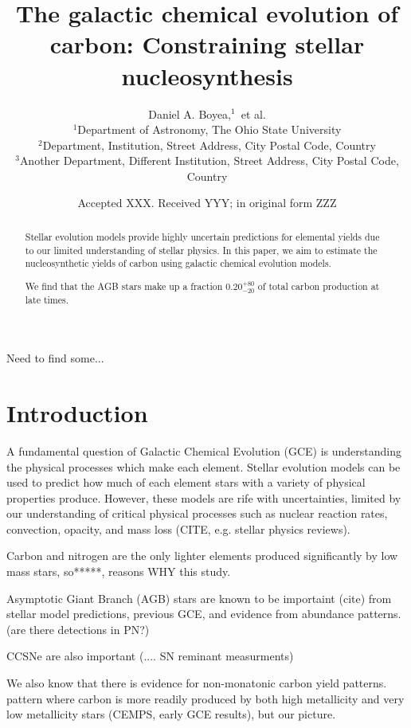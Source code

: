 \documentclass[fleqn,usenatbib]{mnras}
\title[Constraining carbon yields]{The galactic chemical evolution of carbon: Constraining stellar nucleosynthesis}
\author[D. A. Boyea et al.]{
Daniel A. Boyea,$^{1}$\
et al.
\\
$^{1}$Department of Astronomy, The Ohio State University\\
$^{2}$Department, Institution, Street Address, City Postal Code, Country\\
$^{3}$Another Department, Different Institution, Street Address, City Postal Code, Country
}
\date{Accepted XXX. Received YYY; in original form ZZZ}
\begin{document}
\label{firstpage}
\pagerange{\pageref{firstpage}--\pageref{lastpage}}
\maketitle

\begin{abstract}
Stellar evolution models provide highly uncertain predictions for elemental yields due to our limited understanding of stellar physics. In this paper, we aim to estimate the nucleosynthetic yields of carbon using galactic chemical evolution models. 

We find that the AGB stars make up a fraction $0.20_{-20}^{+80}$ of total carbon production at late times. 
\end{abstract}

\begin{keywords}
Need to find some...
\end{keywords}



\section{Introduction}

A fundamental question of Galactic Chemical Evolution (GCE) is understanding the physical processes which make each element. Stellar evolution models can be used to predict how much of each element stars with a variety of physical properties produce. However, these models are rife with uncertainties, limited by our understanding of critical physical processes such as nuclear reaction rates, convection, opacity, and mass loss (CITE, e.g. stellar physics reviews). 

Carbon and nitrogen are the only lighter elements produced significantly by low mass stars, so*****, reasons WHY this study. 

Asymptotic Giant Branch (AGB) stars are known to be importaint (cite) from stellar model predictions, previous GCE, and evidence from abundance patterns. (are there detections in PN?)

CCSNe are also important (.... SN reminant measurments)

We also know that there is evidence for non-monatonic carbon yield patterns. 
pattern where carbon is more readily produced by both high metallicity and very low metallicity stars (CEMPS, early GCE results), but our picture.
\end{document}
